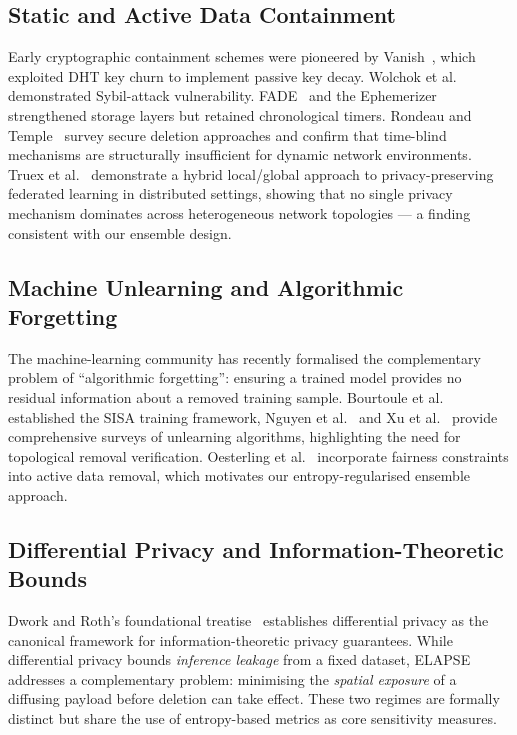 \documentclass[review,12pt]{elsarticle}
\begin{document}
\subsection{Static and Active Data Containment}

Early cryptographic containment schemes were pioneered by
Vanish~\cite{geambasu2009vanish}, which exploited DHT key churn to implement
passive key decay. Wolchok et al.~\cite{wolchok2010defeating} demonstrated
Sybil-attack vulnerability. FADE~\cite{tang2010fade} and the
Ephemerizer~\cite{perlman2005ephemerizer} strengthened storage layers but
retained chronological timers. Rondeau and Temple~\cite{rondeau2021secure}
survey secure deletion approaches and confirm that time-blind mechanisms are
structurally insufficient for dynamic network environments. Truex et al.~\cite{truex2019hybrid} demonstrate a hybrid local/global
approach to privacy-preserving federated learning in distributed settings,
showing that no single privacy mechanism dominates across heterogeneous
network topologies — a finding consistent with our ensemble design.

\subsection{Machine Unlearning and Algorithmic Forgetting}

The machine-learning community has recently formalised the complementary
problem of ``algorithmic forgetting'': ensuring a trained model provides no
residual information about a removed training sample. Bourtoule
et al.~\cite{bourtoule2021machine} established the SISA training framework,
Nguyen et al.~\cite{nguyen2025survey} and Xu et al.~\cite{xu2023machine}
provide comprehensive surveys of unlearning algorithms, highlighting the
need for topological removal verification. Oesterling
et al.~\cite{oesterling2024fair} incorporate fairness constraints into active
data removal, which motivates our entropy-regularised ensemble approach.

\subsection{Differential Privacy and Information-Theoretic Bounds}

Dwork and Roth's foundational treatise~\cite{dwork2014algorithmic} establishes
differential privacy as the canonical framework for information-theoretic
privacy guarantees. While differential privacy bounds \emph{inference
leakage} from a fixed dataset, ELAPSE addresses a complementary problem:
minimising the \emph{spatial exposure} of a diffusing payload before deletion
can take effect. These two regimes are formally distinct but share the use of
entropy-based metrics as core sensitivity measures.
\end{document}
